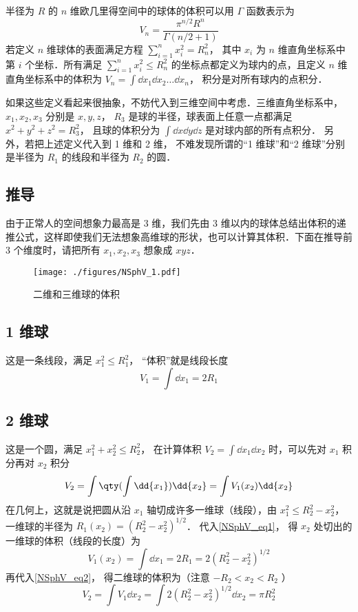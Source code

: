 
半径为 $R$ 的 $n$ 维欧几里得空间中的球体的体积可以用 $\Gamma$ 函数表示为
\begin{equation}\label{NSphV_eq8}
V_n = \frac{\pi^{n/2} R^n}{\Gamma (n/2+1)}
\end{equation}
若定义 $n$ 维球体的表面满足方程 $\sum_{i=1}^n x_i^2 = R_n^2$， 其中 $x_i$ 为 $n$ 维直角坐标系中第 $i$ 个坐标．所有满足 $\sum_{i=1}^n x_i^2 \leqslant R_n^2$ 的坐标点都定义为球内的点，且定义 $n$ 维直角坐标系中的体积为 $V_n = \int \dd{x_1}\dd{x_2}\dots\dd{x_n}$， 积分是对所有球内的点积分．

如果这些定义看起来很抽象，不妨代入到三维空间中考虑．三维直角坐标系中， $x_1, x_2, x_3$ 分别是 $x,y,z$，  $R_3$ 是球的半径，球表面上任意一点都满足 $x^2 + y^2 + z^2 = R_3^2$， 且球的体积分为 $\int \dd{x}\dd{y}\dd{z}$ 是对球内部的所有点积分． 另外，若把上述定义代入到 1 维和 2 维， 不难发现所谓的“1 维球”和“2 维球”分别是半径为 $R_1$ 的线段和半径为 $R_2$ 的圆．

\subsection{推导}
由于正常人的空间想象力最高是 3 维，我们先由 3 维以内的球体总结出体积的递推公式，这样即使我们无法想象高维球的形状，也可以计算其体积．下面在推导前 3 个维度时，请把所有 $x_1, x_2, x_3$ 想象成 $xyz$． 
\begin{figure}[ht]
\centering
\texttt{[image: ./figures/NSphV\_1.pdf]}
\caption{二维和三维球的体积}
\end{figure}
\subsection{1 维球}
这是一条线段，满足 $x_1^2 \leqslant R_1^2$， “体积”就是线段长度
\begin{equation}\label{NSphV_eq1}
V_1 = \int \dd{x_1} = 2 R_1
\end{equation}
\subsection{ 2 维球}
这是一个圆，满足 $x_1^2 + x_2^2 \leqslant R_2^2$， 在计算体积 $V_2 = \int \dd{x_1}\dd{x_2}$ 时，可以先对 $x_1$ 积分再对 $x_2$ 积分
\begin{equation}\label{NSphV_eq2}
V_2 = \int \qty(\int \dd{x_1}) \dd{x_2}  = \int V_1(x_2) \dd{x_2}
\end{equation}
在几何上，这就是说把圆从沿 $x_1$ 轴切成许多一维球（线段），由 $x_1^2 \leqslant R_2^2 - x_2^2$， 一维球的半径为 $R_1(x_2) = (R_2^2 - x_2^2)^{1/2}$． 代入\autoref{NSphV_eq1}， 得 $x_2$ 处切出的一维球的体积（线段的长度）为
\begin{equation}\label{NSphV_eq3}
V_1 (x_2) = \int \dd{x_1} = 2R_1 = 2(R_2^2 - x_2^2)^{1/2}
\end{equation}
再代入\autoref{NSphV_eq2}， 得二维球的体积为（注意 $ -R_2 < x_2 < R_2$ ）
\begin{equation}\label{NSphV_eq4}
V_2 = \int V_1 \dd{x_2} = \int 2 (R_2^2 - x_2^2)^{1/2} \dd{x_2}  = \pi R_2^2
\end{equation}
